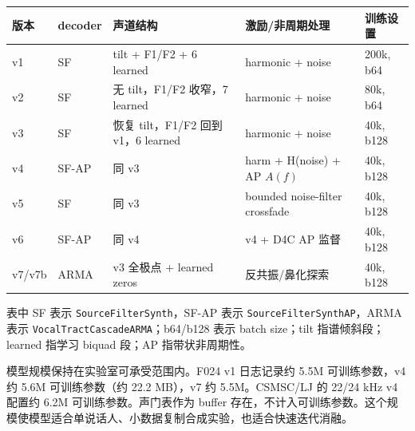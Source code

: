 {\def\LTcaptype{none} %
\begin{longtable}[]{@{}
  >{\raggedright\arraybackslash}p{}
  >{\raggedright\arraybackslash}p{}
  >{\raggedright\arraybackslash}p{}
  >{\raggedright\arraybackslash}p{}
  >{\raggedright\arraybackslash}p{}@{}}
\toprule\noalign{}
\begin{minipage}[b]{\linewidth}\raggedright
版本
\end{minipage} & \begin{minipage}[b]{\linewidth}\raggedright
decoder
\end{minipage} & \begin{minipage}[b]{\linewidth}\raggedright
声道结构
\end{minipage} & \begin{minipage}[b]{\linewidth}\raggedright
激励/非周期处理
\end{minipage} & \begin{minipage}[b]{\linewidth}\raggedright
训练设置
\end{minipage} \\
\midrule\noalign{}
\endhead
\bottomrule\noalign{}
\endlastfoot
v1 & SF & tilt + F1/F2 + 6 learned & harmonic + noise & 200k, b64 \\
v2 & SF & 无 tilt，F1/F2 收窄，7 learned & harmonic + noise & 80k,
b64 \\
v3 & SF & 恢复 tilt，F1/F2 回到 v1，6 learned & harmonic + noise & 40k,
b128 \\
v4 & SF-AP & 同 v3 & harm + H(noise) + AP \(A(f)\) & 40k, b128 \\
v5 & SF & 同 v3 & bounded noise-filter crossfade & 40k, b128 \\
v6 & SF-AP & 同 v4 & v4 + D4C AP 监督 & 40k, b128 \\
v7/v7b & ARMA & v3 全极点 + learned zeros & 反共振/鼻化探索 & 40k,
b128 \\
\end{longtable}
}

表中 SF 表示 \texttt{SourceFilterSynth}，SF-AP 表示
\texttt{SourceFilterSynthAP}，ARMA 表示
\texttt{VocalTractCascadeARMA}；b64/b128 表示 batch size；tilt
指谱倾斜段；learned 指学习 biquad 段；AP 指带状非周期性。

模型规模保持在实验室可承受范围内。F024 v1 日志记录约 5.5M 可训练参数，v4
约 5.6M 可训练参数（约 22.2 MB），v7 约 5.5M。CSMSC/LJ 的 22/24 kHz v4
配置约 6.2M 可训练参数。声门表作为 buffer
存在，不计入可训练参数。这个规模使模型适合单说话人、小数据复制合成实验，也适合快速迭代消融。

